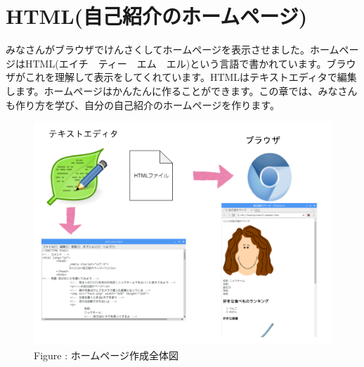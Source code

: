 \documentclass[a4paper,12pt]{jarticle}
\begin{document}
\section{HTML(自己紹介のホームページ)}
みなさんがブラウザでけんさくしてホームページを表示させました。ホームページはHTML(エイチ　ティー　エム　エル)という言語で書かれています。ブラウザがこれを理解して表示をしてくれています。HTMLはテキストエディタで編集します。ホームページはかんたんに作ることができます。この章では、みなさんも作り方を学び、自分の自己紹介のホームページを作ります。


\bigskip


\bigskip


\bigskip


\bigskip



\begin{figure}[hb]
  \centering
  \begin{minipage}{15.801cm}
    {\upshape
      \includegraphics[width=15.801cm]{textbook-img140.png}
      \newline
      Figure : ホームページ作成全体図}
  \end{minipage}
\end{figure}
\clearpage
\end{document}

